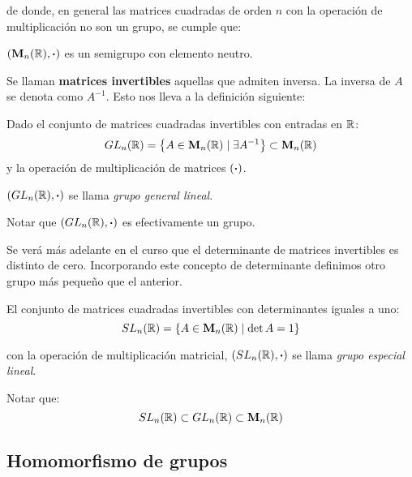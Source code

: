 de donde, en general las matrices cuadradas de orden $n$ con la operación de multiplicación no son un grupo, se cumple que:

\begin{center}
	$(\mathbf{M}_n(\mathbb{R}), \boldsymbol{\cdot})$ es un semigrupo con elemento neutro.
\end{center}

Se llaman \textbf{matrices invertibles} aquellas que admiten inversa. La inversa de $A$ se denota como $A^{-1}$. Esto nos lleva a la definición siguiente:

\begin{fmd-definition}
	
	Dado el conjunto de matrices cuadradas invertibles con entradas en $\mathbb{R}$:
	\[ GL_n(\mathbb{R}) = \left\{ A \in \mathbf{M}_n(\mathbb{R}) \mid \exists A^{-1} \right\} \subset \mathbf{M}_n(\mathbb{R}) \]
	y la operación de multiplicación de matrices $(\boldsymbol{\cdot})$.
	
	$(GL_n(\mathbb{R}), \boldsymbol{\cdot})$ se llama \textit{grupo general lineal}.
\end{fmd-definition}

Notar que $(GL_n(\mathbb{R}), \boldsymbol{\cdot})$ es efectivamente un grupo.

Se verá más adelante en el curso que el determinante de matrices invertibles es distinto de cero. Incorporando este concepto de determinante definimos otro grupo más pequeño que el anterior.

\begin{fmd-definition}
	
	El conjunto de matrices cuadradas invertibles con determinantes iguales a uno:
	\[ SL_n(\mathbb{R}) = \left\{ A \in \mathbf{M}_n(\mathbb{R}) \mid \det A = 1 \right\} \]
	
	con la operación de multiplicación matricial, $(SL_n(\mathbb{R}), \boldsymbol{\cdot})$ se llama \textit{grupo especial lineal}.
\end{fmd-definition}
Notar que:
\[ SL_n(\mathbb{R}) \subset GL_n(\mathbb{R}) \subset \mathbf{M}_n(\mathbb{R})\]

\subsection{Homomorfismo de grupos} \label{sec:homogrupo}

